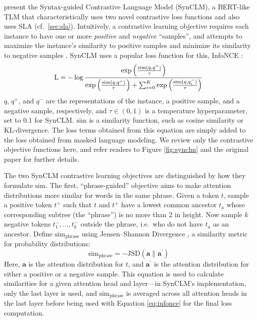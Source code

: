 \documentclass[11pt]{article}
\begin{document}
\citet{zhang-etal-2022-syntax} present the Syntax-guided Contrastive Language Model (SynCLM), a BERT-like TLM that characteristically uses two novel contrastive loss functions and also uses SLA (cf.~\cref{sec:sla}).
Intuitively, a contrastive learning objective requires each instance to have one or more \textit{positive} and \textit{negative} ``samples'', and attempts to maximize the instance's similarity to positive samples and minimize its similarity to negative samples \citep{zhang-etal-2022-contrastive-data}.
SynCLM uses a popular loss function for this, InfoNCE \citep{infonce}:
\begin{equation}\label{eq:infonce}
\small
    \mathrm{L} = -\log 
    \frac
    {\exp\left(\frac{\mathrm{sim}(q,q^+)}{\tau}\right)}
    {\exp\left(\frac{\mathrm{sim}(q,q^+)}{\tau}\right) + \sum_{i=0}^K \exp\left(\frac{\mathrm{sim}(q,q_i^-)}{\tau}\right)}
\end{equation}
$q$, $q^+$, and $q^-$ are the representations of the instance, a positive sample, and a negative sample, respectively, and $\tau \in (0, 1)$ is a temperature hyperparameter, set to $0.1$ for SynCLM.
$\mathrm{sim}$ is a similarity function, such as cosine similarity or KL-divergence.
The loss terms obtained from this equation are simply added to the loss obtained from masked language modeling.
We review only the contrastive objective functions here, and refer readers to Figure \ref{fig:synclm} and the original paper for further details.

The two SynCLM contrastive learning objectives are distinguished by how they formulate $\mathrm{sim}$.
The first, ``phrase-guided'' objective aims to make attention distributions more similar for words in the same phrase.
Given a token $t$, sample a positive token $t^+$ such that $t$ and $t^+$ have a lowest common ancestor $t_a$ whose corresponding subtree (the ``phrase'') is no more than 2 in height.
Now sample $k$ negative tokens $t^-_1, \ldots, t^-_k$ outside the phrase, i.e.~who do not have $t_a$ as an ancestor. 
Define $\mathrm{sim}_\mathrm{phrase}$ using Jensen--Shannon Divergence \citep{endres2003new}, a similarity metric for probability distributions:
\begin{equation}
    \mathrm{sim}_\mathrm{phrase} = -\mathrm{JSD}(\mathbf{a} \parallel \mathbf{a^\prime})
\end{equation}
Here, $\mathbf{a}$ is the attention distribution for $t$, and $\mathbf{a}^\prime$ is the attention distribution for either a positive or a negative sample.
This equation is used to calculate similarities for a given attention head and layer---in SynCLM's implementation, only the last layer is used, and $\mathrm{sim}_\mathrm{phrase}$ is averaged across all attention heads in the last layer before being used with Equation \ref{eq:infonce} for the final loss computation.
\end{document}
